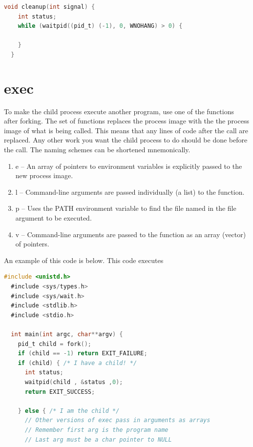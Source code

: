 \begin{itemize}
\begin{lstlisting}[language=C]
  void cleanup(int signal) {
    int status;
    while (waitpid((pid_t) (-1), 0, WNOHANG) > 0) {

    }
  }
\end{lstlisting}

\section{exec}

To make the child process execute another program, use one of the \href{http://man7.org/linux/man-pages/man3/exec.3.html}{} functions after forking.
The  set of functions replaces the process image with the the process image of what is being called.
This means that any lines of code after the  call are replaced.
Any other work you want the child process to do should be done before the  call.
The naming schemes can be shortened mnemonically.

\begin{enumerate}
\item e -- An array of pointers to environment variables is explicitly passed to the new process image.
\item l -- Command-line arguments are passed individually (a list) to the function.
\item p -- Uses the PATH environment variable to find the file named in the file argument to be executed.
\item v -- Command-line arguments are passed to the function as an array (vector) of pointers.
\end{enumerate}

An example of this code is below. This code executes 

\begin{lstlisting}[language=C]
  #include <unistd.h>
  #include <sys/types.h>
  #include <sys/wait.h>
  #include <stdlib.h>
  #include <stdio.h>

  int main(int argc, char**argv) {
    pid_t child = fork();
    if (child == -1) return EXIT_FAILURE;
    if (child) { /* I have a child! */
      int status;
      waitpid(child , &status ,0);
      return EXIT_SUCCESS;

    } else { /* I am the child */
      // Other versions of exec pass in arguments as arrays
      // Remember first arg is the program name
      // Last arg must be a char pointer to NULL


\end{lstlisting}
\end{itemize}
